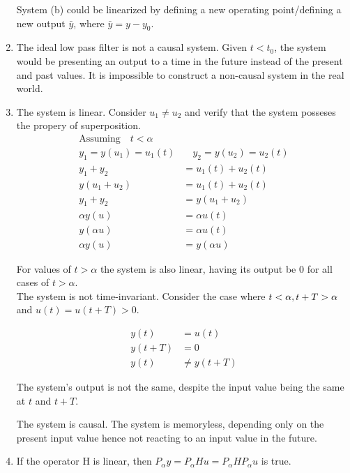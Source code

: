 \documentclass[a4paper,12pt]{article}
\begin{document}
\begin{enumerate}
 System (b) could be linearized by defining a new operating point/defining a new output $\bar y$, where $\bar y = y - y_0$.
 \item The ideal low pass filter is not a causal system.
 Given $t < t_0$, the system would be presenting an output to a time in the future instead of the present and past values.
 It is impossible to construct a non-causal system in the real world.
\item The system is linear.
Consider $u_1 \neq u_2$ and verify that the system posseses the propery of superposition.
\begin{align*}
\text{Assuming} \quad t < \alpha & \\
 y_1 = y(u_1) = u_1(t) & \quad y_2 = y(u_2) = u_2(t)\\
 y_1 + y_2 &= u_1(t) + u_2(t) \\
 y(u_1 + u_2) &= u_1(t) + u_2(t) \\
 y_1 + y_2 &= y(u_1 + u_2)\\
 \alpha y(u) &= \alpha u(t) \\
 y (\alpha u) &= \alpha u(t) \\
 \alpha y(u) &= y (\alpha u)
\end{align*}

For values of $t > \alpha$ the system is also linear, having its output be 0 for all cases of $ t > \alpha$.\\

The system is not time-invariant.
Consider the case where $t < \alpha, \\ t + T > \alpha$ and $u(t) = u(t+T) > 0$.

\begin{align*}
 y (t) &= u(t) \\
 y (t+T) &= 0 \\
 y (t) &\neq y(t+T)
\end{align*}

The system's output is not the same, despite the input value being the same at $t$ and $t+T$.

The system is causal.
The system is memoryless, depending only on the present input value hence not reacting to an input value in the future.

\item If the operator H is linear, then $P_\alpha y = P_\alpha H u = P_\alpha H P_\alpha u$ is true.


\end{enumerate}
\end{document}
